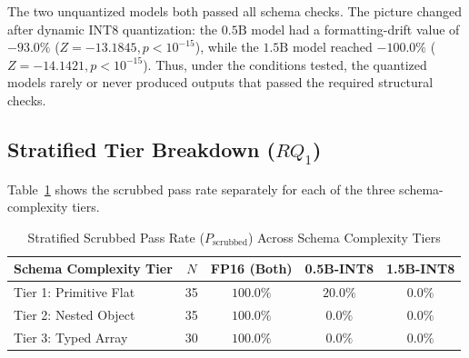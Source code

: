 \documentclass[10pt, conference, a4paper]{IEEEtran}
\begin{document}
\begin{table}[!t]
\caption{Full $2 \times 2$ Experimental Matrix Results ($N=100$, Seed=42, $T=0.0$)}
\label{tab:matrix_results}
\centering
{}
\end{table}


The two unquantized models both passed all schema checks. The picture changed after dynamic $\text{INT8}$ quantization: the $0.5\text{B}$ model had a formatting-drift value of $-93.0\%$ ($Z = -13.1845, p < 10^{-15}$), while the $1.5\text{B}$ model reached $-100.0\%$ ($Z = -14.1421, p < 10^{-15}$). Thus, under the conditions tested, the quantized models rarely or never produced outputs that passed the required structural checks.

\subsection{Stratified Tier Breakdown ($RQ_1$)}
Table~\ref{tab:tier_results} shows the scrubbed pass rate separately for each of the three schema-complexity tiers.

\begin{table}[htbp]
\caption{Stratified Scrubbed Pass Rate ($P_{\text{scrubbed}}$) Across Schema Complexity Tiers}
\label{tab:tier_results}
\centering
\begin{tabular}{@{}lcccc@{}}
\toprule
\textbf{Schema Complexity Tier} & \textbf{$N$} & \textbf{FP16 (Both)} & \textbf{0.5B-INT8} & \textbf{1.5B-INT8} \\ \midrule
Tier 1: Primitive Flat & 35 & $100.0\%$ & $20.0\%$ & $0.0\%$ \\
Tier 2: Nested Object & 35 & $100.0\%$ & $0.0\%$ & $0.0\%$ \\
Tier 3: Typed Array & 30 & $100.0\%$ & $0.0\%$ & $0.0\%$ \\ \bottomrule
\end{tabular}
\end{table}
\end{document}
